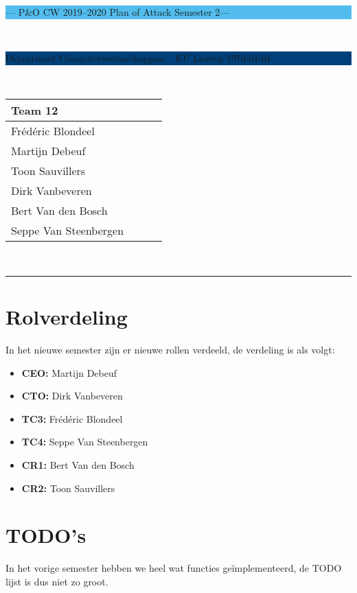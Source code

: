 \documentclass[a4paper,11pt]{article}
\begin{document}
\noindent
\colorbox[HTML]{52BDEC}{\bfseries\parbox{\textwidth}{\centering\large
  --- P\&O CW 2019--2020 Plan of Attack Semester 2---
}}
\\[-1mm]
\colorbox[HTML]{00407A}{\bfseries\color{white}\parbox{\textwidth}{
  Department Computerwetenschappen -- KU Leuven
  \hfill
  \today
}}
\\

\smallskip

\noindent

\begin{tabular}{*4l}
\toprule
\multicolumn{2}{l}{\large\textbf{Team 12}} \\
\midrule
Frédéric Blondeel &  \\
Martijn Debeuf &  \\
Toon Sauvillers &  \\ %
Dirk Vanbeveren &  \\
Bert Van den Bosch &  \\ 
Seppe Van Steenbergen &  \\

\bottomrule
\hline
\end{tabular}\\
\noindent


{\color[HTML]{52BDEC} \rule{\linewidth}{1mm} }

\section{Rolverdeling}
In het nieuwe semester zijn er nieuwe rollen verdeeld, de verdeling is als volgt:
\begin{multicols}{2}
\begin{itemize}
	\item {\bf CEO:} Martijn Debeuf
	\item {\bf CTO:} Dirk Vanbeveren
	\item {\bf TC3:} Frédéric Blondeel
	\item {\bf TC4:} Seppe Van Steenbergen
	\item {\bf CR1:} Bert Van den Bosch
	\item {\bf CR2:} Toon Sauvillers
\end{itemize}
\end{multicols}
\section{TODO's}
In het vorige semester hebben we heel wat functies geïmplementeerd, de TODO lijst is dus niet zo groot.
\end{document}
